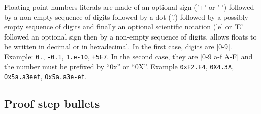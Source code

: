 
Floating-point numbers literals are made of an optional sign ('+' or
'-') followed by a non-empty sequence of digits followed by a dot
('.') followed by a possibly empty sequence of digits and finally an
optional scientific notation ('e' or 'E' followed an optional sign
then by a non-empty sequence of digits. {\focal} allows floats to be
written in decimal or in hexadecimal. In the first case, digits are
[0-9]. Example: {\tt 0.}, {\tt -0.1}, {\tt 1.e-10}, {\tt +5E7}.
In the second case, they are [0-9 a-f A-F] and the number must be
prefixed by ``0x'' or ``0X''. Example {\tt 0xF2.E4}, {\tt 0X4.3A},
{\tt Ox5a.a3eef}, {\tt Ox5a.a3e-ef}.

\subsection{Proof step bullets}
\begin{syn}
 \is
  \tok{<}  \tok{>}
\end{syn}

